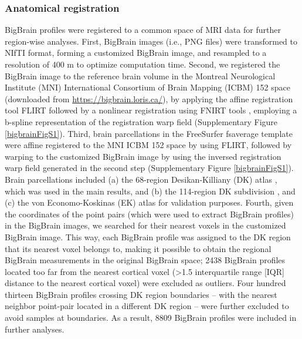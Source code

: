 \begin{refsection}
\subsubsection*{Anatomical registration}
BigBrain profiles were registered to a common space of MRI data for further region-wise analyses. First, BigBrain images (i.e., PNG files) were transformed to NIfTI format, forming a customized BigBrain image, and resampled to a resolution of 400 {\textmu}m to optimize computation time. Second, we registered the BigBrain image to the reference brain volume in the Montreal Neurological Institute (MNI) International Consortium of Brain Mapping (ICBM) 152 space (downloaded from \url{https://bigbrain.loris.ca/}), by applying the affine registration tool FLIRT \citep{JENKINSON2001143,JENKINSON2002825} followed by a nonlinear registration using FNIRT tools \citep{Andersson2007NonlinearOF}, employing a b-spline representation of the registration warp field (Supplementary Figure \ref{bigbrainFigS1}). Third, brain parcellations in the FreeSurfer fsaverage template were affine registered to the MNI ICBM 152 space by using FLIRT, followed by warping to the customized BigBrain image by using the inversed registration warp field generated in the second step (Supplementary Figure \ref{bigbrainFigS1}). Brain parcellations included (a) the 68-region Desikan-Killiany (DK) atlas \citep{DESIKAN2006968,Fischl2004parcellation}, which was used in the main results, and (b) the 114-region DK subdivision \citep{CAMMOUN2012386}, and (c) the von Economo-Koskinas (EK) atlas \citep{Scholtens2015ECONOMO,SCHOLTENS2018ECONOMO,von1925cytoarchitektonik} for validation purposes. Fourth, given the coordinates of the point pairs (which were used to extract BigBrain profiles) in the BigBrain images, we searched for their nearest voxels in the customized BigBrain image. This way, each BigBrain profile was assigned to the DK region that its nearest voxel belongs to, making it possible to obtain the regional BigBrain measurements in the original BigBrain space; 2438 BigBrain profiles located too far from the nearest cortical voxel (>1.5 interquartile range [IQR] distance to the nearest cortical voxel) were excluded as outliers. Four hundred thirteen BigBrain profiles crossing DK region boundaries -- with the nearest neighbor point-pair located in a different DK region -- were further excluded to avoid samples at boundaries. As a result, 8809 BigBrain profiles were included in further analyses.


\end{refsection}
